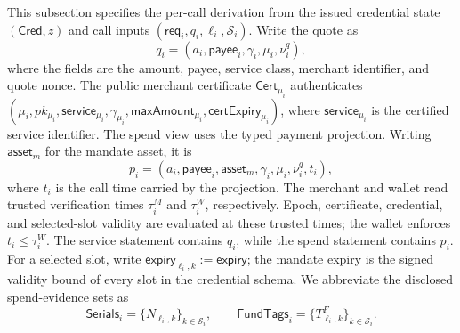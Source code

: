 \documentclass[letterpaper]{article}
\begin{document}
This subsection specifies the per-call derivation from the issued
credential state \((\mathsf{Cred},z)\) and call inputs
\((\mathsf{req}_i,q_i,\ell_i,\mathcal S_i)\).  Write the quote as
\[
q_i=(a_i,\mathsf{payee}_i,\gamma_i,\mu_i,\nu_i^q),
\]
where the fields are the amount, payee, service class, merchant identifier,
and quote nonce.  The public merchant certificate
\(\mathsf{Cert}_{\mu_i}\) authenticates
\((\mu_i,pk_{\mu_i},\mathsf{service}_{\mu_i},\gamma_{\mu_i},
\mathsf{maxAmount}_{\mu_i},\mathsf{certExpiry}_{\mu_i})\), where
\(\mathsf{service}_{\mu_i}\) is the certified service identifier.  The spend view
uses the typed payment projection.  Writing \(\mathsf{asset}_m\) for the
mandate asset, it is
\begin{equation}
  p_i=(a_i,\mathsf{payee}_i,\mathsf{asset}_m,
       \gamma_i,\mu_i,\nu_i^q,t_i),
\label{eq:payment-projection-schema}
\end{equation}
where \(t_i\) is the call time carried by the projection.  The merchant and
wallet read trusted verification times
\(\tau_i^M\) and \(\tau_i^W\), respectively.  Epoch, certificate,
credential, and selected-slot validity are evaluated at these trusted times;
the wallet enforces \(t_i\le\tau_i^W\).  The service statement contains
\(q_i\), while
the spend statement contains \(p_i\).  For a selected slot, write
\(\mathsf{expiry}_{\ell_i,k}:=\mathsf{expiry}\); the mandate expiry is the
signed validity bound of every slot in the credential schema.
We abbreviate the disclosed spend-evidence sets as
\[
  \mathsf{Serials}_i=\{N_{\ell_i,k}\}_{k\in\mathcal S_i},\qquad
  \mathsf{FundTags}_i=\{T^F_{\ell_i,k}\}_{k\in\mathcal S_i}.
\]
\end{document}
